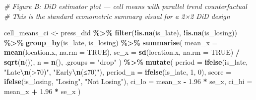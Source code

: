 \documentclass[
]{article}
\newenvironment{Shaded}{\begin{snugshade}}{\end{snugshade}}
\newcommand{\AttributeTok}[1]{\textcolor[rgb]{0.13,0.29,0.53}{#1}}
\newcommand{\CommentTok}[1]{\textcolor[rgb]{0.56,0.35,0.01}{\textit{#1}}}
\newcommand{\ConstantTok}[1]{\textcolor[rgb]{0.56,0.35,0.01}{#1}}
\newcommand{\DecValTok}[1]{\textcolor[rgb]{0.00,0.00,0.81}{#1}}
\newcommand{\FloatTok}[1]{\textcolor[rgb]{0.00,0.00,0.81}{#1}}
\newcommand{\FunctionTok}[1]{\textcolor[rgb]{0.13,0.29,0.53}{\textbf{#1}}}
\newcommand{\NormalTok}[1]{#1}
\newcommand{\OtherTok}[1]{\textcolor[rgb]{0.56,0.35,0.01}{#1}}
\newcommand{\SpecialCharTok}[1]{\textcolor[rgb]{0.81,0.36,0.00}{\textbf{#1}}}
\newcommand{\StringTok}[1]{\textcolor[rgb]{0.31,0.60,0.02}{#1}}
\begin{document}
\begin{Shaded}
\begin{Highlighting}[]
\CommentTok{\# Figure B: DiD estimator plot — cell means with parallel trend counterfactual}
\CommentTok{\# This is the standard econometric summary visual for a 2×2 DiD design}

\NormalTok{cell\_means\_ci }\OtherTok{\textless{}{-}}\NormalTok{ press\_did }\SpecialCharTok{\%\textgreater{}\%}
  \FunctionTok{filter}\NormalTok{(}\SpecialCharTok{!}\FunctionTok{is.na}\NormalTok{(is\_late), }\SpecialCharTok{!}\FunctionTok{is.na}\NormalTok{(is\_losing)) }\SpecialCharTok{\%\textgreater{}\%}
  \FunctionTok{group\_by}\NormalTok{(is\_late, is\_losing) }\SpecialCharTok{\%\textgreater{}\%}
  \FunctionTok{summarise}\NormalTok{(}
    \AttributeTok{mean\_x =} \FunctionTok{mean}\NormalTok{(location.x, }\AttributeTok{na.rm =} \ConstantTok{TRUE}\NormalTok{),}
    \AttributeTok{se\_x   =} \FunctionTok{sd}\NormalTok{(location.x,   }\AttributeTok{na.rm =} \ConstantTok{TRUE}\NormalTok{) }\SpecialCharTok{/} \FunctionTok{sqrt}\NormalTok{(}\FunctionTok{n}\NormalTok{()),}
    \AttributeTok{n      =} \FunctionTok{n}\NormalTok{(),}
    \AttributeTok{.groups =} \StringTok{"drop"}
\NormalTok{  ) }\SpecialCharTok{\%\textgreater{}\%}
  \FunctionTok{mutate}\NormalTok{(}
    \AttributeTok{period   =} \FunctionTok{ifelse}\NormalTok{(is\_late,   }\StringTok{"Late}\SpecialCharTok{\textbackslash{}n}\StringTok{(\textgreater{}70\textquotesingle{})"}\NormalTok{, }\StringTok{"Early}\SpecialCharTok{\textbackslash{}n}\StringTok{(≤70\textquotesingle{})"}\NormalTok{),}
    \AttributeTok{period\_n =} \FunctionTok{ifelse}\NormalTok{(is\_late, }\DecValTok{1}\NormalTok{, }\DecValTok{0}\NormalTok{),}
    \AttributeTok{score    =} \FunctionTok{ifelse}\NormalTok{(is\_losing, }\StringTok{"Losing"}\NormalTok{,       }\StringTok{"Not Losing"}\NormalTok{),}
    \AttributeTok{ci\_lo    =}\NormalTok{ mean\_x }\SpecialCharTok{{-}} \FloatTok{1.96} \SpecialCharTok{*}\NormalTok{ se\_x,}
    \AttributeTok{ci\_hi    =}\NormalTok{ mean\_x }\SpecialCharTok{+} \FloatTok{1.96} \SpecialCharTok{*}\NormalTok{ se\_x}
\NormalTok{  )}


\end{Highlighting}
\end{Shaded}
\end{document}

